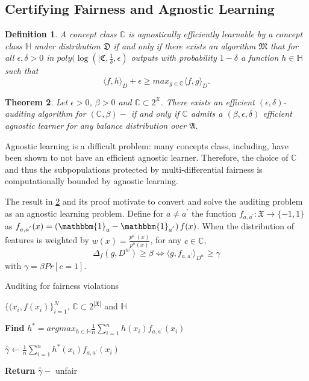 \documentclass{article}
\newtheorem{thm}{Theorem}[section]
\newtheorem{defn}[thm]{Definition}
\begin{document}
\subsection{Certifying Fairness and Agnostic Learning}
\begin{defn}
A concept class $\mathbb{C}$ is agnostically efficiently learnable by a concept class $\mathbb{H}$ under distribution $\mathfrak{D}$ if and only if there exists an algorithm $\mathfrak{M}$ that for all $\epsilon, \delta >0$ in $poly(\log(|\mathfrak{C}, \frac{1}{\delta}, \epsilon)$ outputs with probability $1-\delta$ a function $h\in \mathbb{H}$ such that
$$ \langle f,h\rangle_{D} + \epsilon \geq max_{g\in \mathbb{C}}\langle f, g\rangle_{D}. $$
\end{defn}

\begin{thm}
\label{thm: al}
Let $\epsilon > 0$, $\beta >0$ and $\mathbb{C}\subset 2^{\mathfrak{X}}$. There exists an efficient $(\epsilon, \delta)$-auditing algorithm for $(\mathbb{C}, \beta)-$ if and only if $\mathbb{C}$ admits a $(\beta, \epsilon,\delta)$ efficient agnostic learner for any balance distribution over $\mathfrak{A}$.  
\end{thm}

Agnostic learning is a difficult problem: many concepts class, including, have been shown to not have an efficient agnostic learner. Therefore, the choice of $\mathbb{C}$ and thus the subpopulations protected by multi-differential fairness is computationally bounded by agnostic learning. 

The result in \ref{thm: al} and its proof motivate to convert and solve the auditing problem as an agnostic learning problem. Define for $a\neq a^{'}$ the function $f_{a, a^{'}}: \mathfrak{X}\rightarrow \{-1, 1\}$ as $f_{a, a^{'}}(x) = \left(\mathbbm{1}_{a} - \mathbbm{1}_{a^{'}}\right)f(x)$. When the distribution of features is weighted by  $w(x)=\frac{p^{a^{'}}(x)}{p^{a}(x)}$, for any $c\in \mathbb{C}$,
\begin{equation}
    \Delta_{f}(g, D^{w}) \geq \beta \iff \langle g, f_{a, a^{'}}\rangle_{D^{w}} \geq \gamma
\end{equation}
with $\gamma=\beta Pr[c=1]$. 


\begin{algorithm}[tb]
   \caption{Auditing for fairness violations}
   \label{alg:amdf}
\begin{algorithmic}
     $\{(x_i, f(x_i)\}_{i=1}^{N}$, $\mathbb{C}\subset 2^{|\mathfrak{X}|}$ and $\mathbb{H}$
   
   {\bfseries Find} $h^{*} = argmax_{h\in \mathbb{H}}\frac{1}{n}\displaystyle\sum_{i=1}^{n}h(x_{i})f_{a, a^{'}}(x_{i})$
 
    $\hat{\gamma}\leftarrow \frac{1}{n}\displaystyle\sum_{i=1}^{n}h^{*}(x_{i})f_{a, a^{'}}(x_{i})$
    
   {\bfseries Return} $\hat{\gamma}-$ unfair
 
   
   
\end{algorithmic}
\end{algorithm}
\end{document}
